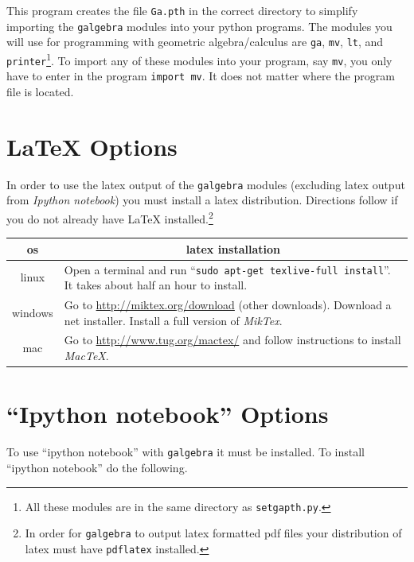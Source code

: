 \documentclass[12pt]{report}
\newcommand{\T}[1]{\texttt{#1}}
\begin{document}
This program creates the file \T{Ga.pth} in the correct directory to simplify importing the \T{galgebra} modules into your python
programs.  The modules you will use for programming with geometric algebra/calculus are \T{ga}, \T{mv}, \T{lt}, and
\T{printer}\footnote{All these modules are in the same directory as \T{setgapth.py}.}.  To import any of these modules into your
program, say \T{mv}, you only have to enter in the program \T{import mv}.  It does not matter where the program file is located.

\section{{\LaTeX} Options}
In order to use the latex output of the \T{galgebra} modules (excluding latex output from \emph{Ipython notebook}) you must install
a latex distribution.  Directions follow if you do not already have {\LaTeX} installed.\footnote{In order for \T{galgebra} to output
 latex formatted pdf files your distribution of latex must have \T{pdflatex} installed.}
\begin{center}
\begin{tabular}{cl}
os & \multicolumn{1}{c}{latex installation} \vspace{5pt} \\ \hline
linux & \parbox{4in}{\vspace{5pt} Open a terminal and run ``\T{sudo apt-get texlive-full install}''.  It takes about half an hour
                     to install.\vspace{5pt}} \\ \hline
windows & \parbox{4in}{\vspace{5pt}Go to \url{http://miktex.org/download} (other downloads). Download a net installer.
                       Install a full version of \emph{MikTex}.\vspace{5pt}}\\  \hline
mac & \parbox{4in}{\vspace{5pt}Go to \url{http://www.tug.org/mactex/} and follow instructions to install
                   \emph{MacTeX}.\vspace{5pt}} \\ \hline
\end{tabular}
\end{center}
\section{``Ipython notebook'' Options}
To use ``ipython notebook'' with \T{galgebra} it must be installed.  To install ``ipython notebook'' do the following.
\end{document}
